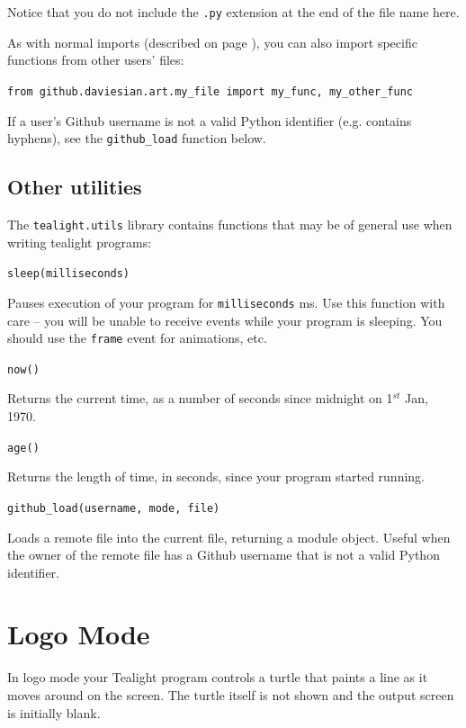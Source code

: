 \documentclass[12pt,a4paper,twoside]{article}
\renewcommand{\_}{\texttt{\symbol{95}}}
\begin{document}
Notice that you do not include the \verb^.py^ extension at the end of the file name here.

As with normal imports (described on page \pageref{subsec:libraries}), you can also import specific functions from other users' files:

\verb^from github.daviesian.art.my_file import my_func, my_other_func^

If a user's Github username is not a valid Python identifier (e.g. contains hyphens), see the \verb^github_load^ function below.

\subsection{Other utilities}

The \verb^tealight.utils^ library contains functions that may be of general use when writing tealight programs:

\begin{bulletlist}
\item \verb^sleep(milliseconds)^

	Pauses execution of your program for \verb^milliseconds^ ms. Use this function with care -- you will be unable to receive events while your program is sleeping. You should use the \verb^frame^ event for animations, etc.

\item \verb^now()^

	Returns the current time, as a number of seconds since midnight on 1$^{st}$ Jan, 1970.

\item \verb^age()^

	Returns the length of time, in seconds, since your program started running.
\item \verb^github_load(username, mode, file)^

	Loads a remote file into the current file, returning a module object. Useful when the owner of the remote file has a Github username that is not a valid Python identifier.

\end{bulletlist}


\newpage
\section{Logo Mode} \label{sec:logo-mode}

In logo mode your Tealight program controls a turtle that paints
a line as it moves around on the screen. The turtle itself is
not shown and the output screen is initially blank.
\end{document}
